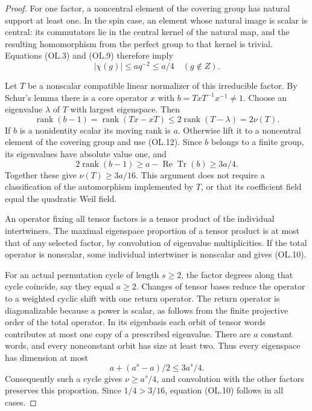 \begin{proof}
For one factor, a noncentral element of the covering group has
natural support at least one. In the spin case, an element
whose natural image is scalar is central: its commutators lie
in the central kernel of the natural map, and the resulting
homomorphism from the perfect group to that kernel is trivial.
Equations (OL.3) and (OL.9) therefore imply
\[
                         |\chi(g)|\le a q^{-2}\le a/4
                         \quad(g\notin Z).
                                                               \tag{OL.12}
\]

Let $T$ be a nonscalar compatible linear normalizer of this
irreducible factor. By Schur's lemma there is a core operator
$x$ with $b=TxT^{-1}x^{-1}\ne1$. Choose an eigenvalue
$\lambda$ of $T$ with largest eigenspace. Then
\[
 \operatorname{rank}(b-1)
   =\operatorname{rank}(Tx-xT)
   \le2\operatorname{rank}(T-\lambda)=2\nu(T).
                                                               \tag{OL.13}
\]
If $b$ is a nonidentity scalar its moving rank is $a$.
Otherwise lift it to a noncentral element of the covering
group and use (OL.12). Since $b$ belongs to a finite group,
its eigenvalues have absolute value one, and
\[
 2\operatorname{rank}(b-1)
 \ge a-\operatorname{Re}\operatorname{Tr}(b)\ge3a/4.
\]
Together these give $\nu(T)\ge3a/16$. This argument does not
require a classification of the automorphism implemented by
$T$, or that its coefficient field equal the quadratic Weil
field.

An operator fixing all tensor factors is a tensor product of
the individual intertwiners. The maximal eigenspace proportion
of a tensor product is at most that of any selected factor,
by convolution of eigenvalue multiplicities. If the total
operator is nonscalar, some individual intertwiner is
nonscalar and gives (OL.10).

For an actual permutation cycle of length $s\ge2$, the factor
degrees along that cycle coincide, say they equal $a\ge2$.
Changes of tensor bases reduce the operator to a weighted
cyclic shift with one return operator. The return operator is
diagonalizable because a power is scalar, as follows from the
finite projective order of the total operator. In its
eigenbasis each orbit of tensor words contributes at most one
copy of a prescribed eigenvalue. There are $a$ constant words,
and every nonconstant orbit has size at least two. Thus every
eigenspace has dimension at most
\[
                       a+(a^s-a)/2\le3a^s/4.
\]
Consequently such a cycle gives $\nu\ge a^s/4$, and convolution
with the other factors preserves this proportion. Since
$1/4>3/16$, equation (OL.10) follows in all cases.


\end{proof}
